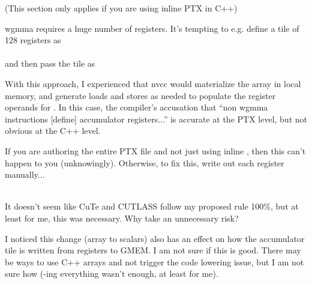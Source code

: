 \filbreak
{}

(This section only applies if you are using inline PTX in C++)

wgmma requires a huge number of registers.
It's tempting to e.g. define a tile of 128 registers as\\
\\
and then pass the tile as\\

\filbreak
With this approach, I experienced that nvcc would materialize the array in local memory, and generate loads and stores as needed to populate the register operands for .
In this case, the compiler's accusation that ``non wgmma instructions [define] accumulator registers...'' is accurate at the PTX level, but not obvious at the C++ level.

\filbreak
If you are authoring the entire PTX file and not just using inline , then this can't happen to you (unknowingly).
Otherwise, to fix this, write out each register manually...\\
\\

\filbreak
It doesn't seem like CuTe and CUTLASS follow my proposed rule 100\%, but at least for me, this was necessary.
Why take an unnecessary risk?

\filbreak
\textbf{} I noticed this change (array to scalars) also has an effect on how the accumulator tile is written from registers to GMEM.
I am not sure if this is good.
There may be ways to use C++ arrays and not trigger the code lowering issue, but I am not sure how (-ing everything wasn't enough, at least for me).

\filbreak
{}

